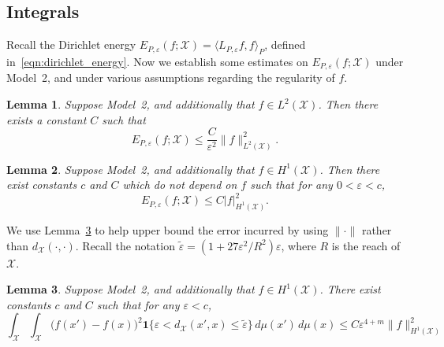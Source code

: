 \documentclass[aos]{imsart}
\theoremstyle{plain}
\newtheorem{lemma}{Lemma}
\theoremstyle{definition}
\theoremstyle{remark}
\newcommand{\dotp}[2]{\langle #1, #2 \rangle}
\newcommand{\wt}[1]{\widetilde{#1}}
\newcommand{\mc}[1]{\mathcal{#1}}
\newcommand{\1}{\mathbf{1}}
\begin{document}
\subsection{Integrals}
\label{subsec:manifold_integrals}
Recall the Dirichlet energy $E_{P,\varepsilon}(f;\mc{X}) = \dotp{L_{P,\varepsilon}f}{f}_P$, defined in~\eqref{eqn:dirichlet_energy}. Now we establish some estimates on $E_{P,\varepsilon}(f;\mc{X})$ under Model~2, and under various assumptions regarding the regularity of $f$.
\begin{lemma}
	\label{lem:dirichlet_energy_l2}
	Suppose Model~2, and additionally that $f \in L^2(\mc{X})$. Then there exists a constant $C$ such that
	\begin{equation}
	\label{eqn:dirichlet_energy_l2}
	E_{P,\varepsilon}(f;\mc{X}) \leq \frac{C}{\varepsilon^2} \|f\|_{L^2(\mc{X})}^2.
	\end{equation}
\end{lemma}
\begin{lemma}
	\label{lem:dirichlet_energy_sobolev}
	Suppose Model~2, and additionally that $f \in H^1(\mc{X})$. Then there exist constants $c$ and $C$ which do not depend on $f$ such that for any $0 < \varepsilon < c$,
	\begin{equation}
	\label{eqn:dirichlet_energy_sobolev}
	E_{P,\varepsilon}(f;\mc{X}) \leq C |f|_{H^1(\mc{X})}^2.
	\end{equation}
\end{lemma}

We use Lemma~\ref{lem:dirichlet_energy_remainder} to help upper bound the error incurred by using $\|\cdot\|$ rather than $d_{\mc{X}}(\cdot,\cdot)$. Recall the notation $\wt{\varepsilon} = (1 + 27\varepsilon^2/R^2)\varepsilon$, where $R$ is the reach of $\mc{X}$.
\begin{lemma}
	\label{lem:dirichlet_energy_remainder}
	Suppose Model~2, and additionally that $f \in H^1(\mc{X})$. There exist constants $c$ and $C$ such that for any $\varepsilon < c$,
	\begin{equation}
	\label{eqn:dirichlet_energy_remainder}
	\int_{\mc{X}} \int_{\mc{X}} \bigl(f(x') - f(x)\bigr)^2 \1\{\varepsilon < d_{\mc{X}}(x',x) \leq \wt{\varepsilon}\} \,d\mu(x') \,d\mu(x) \leq C \varepsilon^{4 + m} \|f\|_{H^1(\mc{X})}^2
	\end{equation}
\end{lemma}
\end{document}
